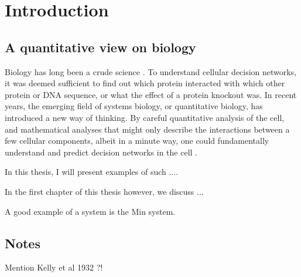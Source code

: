 \chapter*{Introduction}
\label{chapter:introduction}






\section*{A quantitative view on biology}

Biology has long been a crude science \cite{Lazebnik2003}.
%
To understand cellular decision networks, it was deemed sufficient to find out which protein interacted with which other protein or DNA sequence, or what the effect of a protein knockout was.
%
In recent years, the emerging field of systems biology, or quantitative biology, has introduced a new way of thinking.
%
By careful quantitative analysis of the cell, and mathematical analyses that might only describe the interactions between a few cellular components, albeit in a minute way, 
one could fundamentally understand and predict decision networks in the cell \cite{Alon2006}.

In this thesis, I will present examples of such ....

In the first chapter of this thesis however, we discuss ...

A good example of a system is the Min system.




\section*{Notes}

Mention Kelly et al 1932 \cite{Kelly1932}?!


